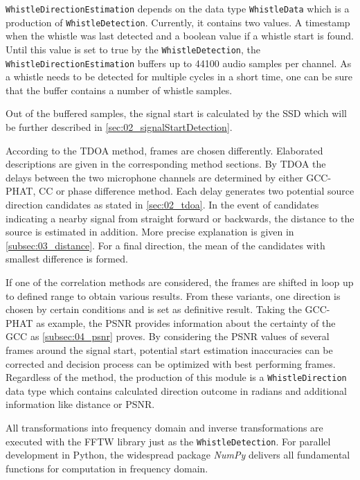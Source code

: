 \lstinline!WhistleDirectionEstimation! depends on the data type \lstinline!WhistleData!
which is a production of \lstinline!WhistleDetection!.
Currently, it contains two values. A timestamp when the whistle was last detected
and a boolean value if a whistle start is found.
Until this value is set to true by the \lstinline!WhistleDetection!, the
\lstinline!WhistleDirectionEstimation! buffers up to
44100 audio samples per channel.
As a whistle needs to be detected for multiple cycles in a short time, one can
be sure that the buffer contains a number of whistle samples.

Out of the buffered samples, the signal start is calculated by the \ac{SSD}
which will be further described in \cref{sec:02_signalStartDetection}.

According to the \ac{TDOA} method, frames are chosen differently.
Elaborated descriptions are given in the corresponding method sections.
By \ac{TDOA} the delays between the two microphone channels are
determined by either \ac{GCC-PHAT}, \ac{CC} or phase difference method.
Each delay generates two potential source direction candidates as stated
in \cref{sec:02_tdoa}.
In the event of candidates indicating a nearby signal from straight forward or
backwards, the distance to the source is estimated in addition.
More precise explanation is given in \cref{subsec:03_distance}.
For a final direction, the mean of the candidates with smallest difference
is formed.

If one of the correlation methods are considered, the frames are
shifted in loop up to defined range to obtain various results.
From these variants, one direction is chosen by certain conditions and
is set as definitive result.
Taking the \ac{GCC-PHAT} as example, the \ac{PSNR} provides information about
the certainty of the \ac{GCC} as \cref{subsec:04_psnr} proves.
By considering the \ac{PSNR} values of several frames around the signal start,
potential start estimation inaccuracies can be corrected and decision process
can be optimized with best performing frames.
Regardless of the method, the production of this module is a
\lstinline!WhistleDirection! data type which contains calculated
direction outcome in radians and additional information like distance or \ac{PSNR}.

All transformations into frequency domain and inverse transformations
are executed with the \ac{FFTW} library just as the \lstinline!WhistleDetection!.
For parallel development in Python, the widespread package \textit{NumPy} delivers
all fundamental functions for computation in frequency domain.






